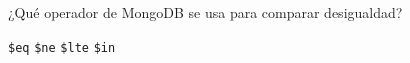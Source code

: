 \question[1] ¿Qué operador de MongoDB se usa para comparar desigualdad?
\begin{choices}
\choice \texttt{\$eq}
\CorrectChoice \texttt{\$ne}
\choice \texttt{\$lte}
\choice \texttt{\$in}
\end{choices}
